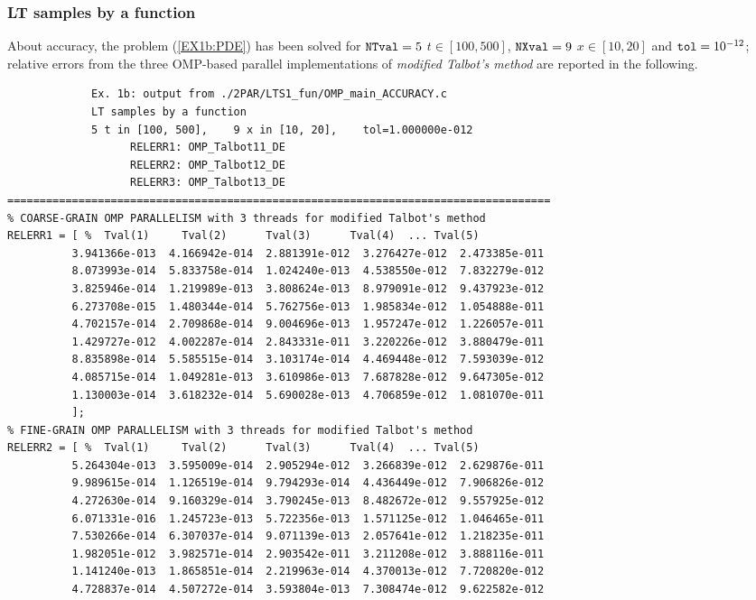 \documentclass[a4paper,10pt]{report}%
\begin{document}
\subsubsection{LT samples by a function}
About accuracy, the problem (\ref{EX1b:PDE}) has been solved for ${\tt NTval}=5$ $t\in[100, 500]$, ${\tt NXval}=9$
$x\in[10,20]$ and ${\tt tol}=10^{-12}$; relative errors from the three OMP-based parallel implementations of
{\em modified Talbot's method} are reported in the following.
\begin{lstlisting}
             Ex. 1b: output from ./2PAR/LTS1_fun/OMP_main_ACCURACY.c
             LT samples by a function
             5 t in [100, 500],    9 x in [10, 20],    tol=1.000000e-012
                   RELERR1: OMP_Talbot11_DE
                   RELERR2: OMP_Talbot12_DE
                   RELERR3: OMP_Talbot13_DE
====================================================================================
% COARSE-GRAIN OMP PARALLELISM with 3 threads for modified Talbot's method
RELERR1 = [ %  Tval(1)     Tval(2)      Tval(3)      Tval(4)  ... Tval(5)
          3.941366e-013  4.166942e-014  2.881391e-012  3.276427e-012  2.473385e-011
          8.073993e-014  5.833758e-014  1.024240e-013  4.538550e-012  7.832279e-012
          3.825946e-014  1.219989e-013  3.808624e-013  8.979091e-012  9.437923e-012
          6.273708e-015  1.480344e-014  5.762756e-013  1.985834e-012  1.054888e-011
          4.702157e-014  2.709868e-014  9.004696e-013  1.957247e-012  1.226057e-011
          1.429727e-012  4.002287e-014  2.843331e-011  3.220226e-012  3.880479e-011
          8.835898e-014  5.585515e-014  3.103174e-014  4.469448e-012  7.593039e-012
          4.085715e-014  1.049281e-013  3.610986e-013  7.687828e-012  9.647305e-012
          1.130003e-014  3.618232e-014  5.690028e-013  4.706859e-012  1.081070e-011
          ];
% FINE-GRAIN OMP PARALLELISM with 3 threads for modified Talbot's method
RELERR2 = [ %  Tval(1)     Tval(2)      Tval(3)      Tval(4)  ... Tval(5)
          5.264304e-013  3.595009e-014  2.905294e-012  3.266839e-012  2.629876e-011
          9.989615e-014  1.126519e-014  9.794293e-014  4.436449e-012  7.906826e-012
          4.272630e-014  9.160329e-014  3.790245e-013  8.482672e-012  9.557925e-012
          6.071331e-016  1.245723e-013  5.722356e-013  1.571125e-012  1.046465e-011
          7.530266e-014  6.307037e-014  9.071139e-013  2.057641e-012  1.218235e-011
          1.982051e-012  3.982571e-014  2.903542e-011  3.211208e-012  3.888116e-011
          1.141240e-013  1.865851e-014  2.219963e-014  4.370013e-012  7.720820e-012
          4.728837e-014  4.507272e-014  3.593804e-013  7.308474e-012  9.622582e-012

\end{lstlisting}
\end{document}
